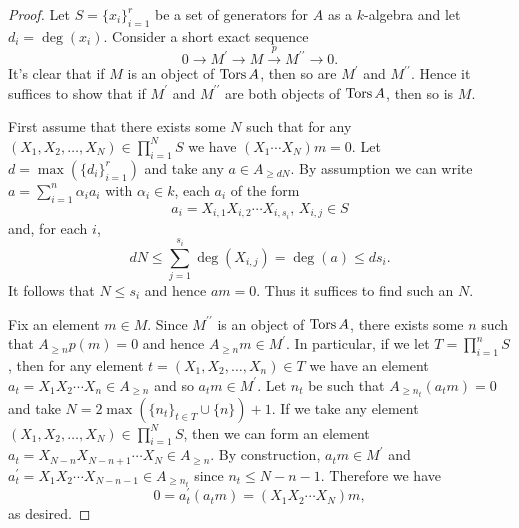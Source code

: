 \begin{proof}
  Let \(S = \{x_i\}_{i=1}^r\) be a set of generators for \(A\) as a \(k\)-algebra and let \(d_i = \deg(x_i)\).
  Consider a short exact sequence
  \[0 \to M^\prime \to M \overset{p}\to M^{\prime\prime} \to 0.\]
  It's clear that if \(M\) is an object of \(\operatorname{Tors}A\), then so are \(M^\prime\) and \(M^{\prime\prime}\).
  Hence it suffices to show that if \(M^\prime\) and \(M^{\prime\prime}\) are both objects of \(\operatorname{Tors}A\), then so is \(M\).
  
  First assume that there exists some \(N\) such that for any \((X_1, X_2, \ldots, X_N) \in \prod_{i = 1}^N S\) we have \((X_1 \cdots X_N)m = 0\).
  Let \(d = \max(\{d_i\}_{i = 1}^r)\) and take any \(a \in A_{\geq dN}\).
  By assumption we can write \(a = \sum_{i=1}^n \alpha_i a_i\) with \(\alpha_i \in k\), each \(a_i\) of the form
  \[a_i = X_{i,1} X_{i,2}\cdots X_{i, s_i},\, X_{i,j} \in S\]
  and, for each \(i\),
  \[dN \leq \sum_{j = 1}^{s_i} \deg(X_{i,j}) = \deg(a) \leq ds_i.\]
  It follows that \(N \leq s_i\) and hence \(am = 0\).
  Thus it suffices to find such an \(N\).

  Fix an element \(m \in M\).
  Since \(M^{\prime\prime}\) is an object of \(\operatorname{Tors}A\), there exists some \(n\) such that \(A_{\geq n} p(m) = 0\) and hence \(A_{\geq n}m \in M^\prime\).
  In particular, if we let \(T = \prod_{i = 1}^n S\), then for any element \(t = (X_1, X_2, \ldots, X_n) \in T\) we have an element \(a_t = X_1 X_2 \cdots X_n \in A_{\geq n}\) and so \(a_t m \in M^\prime\).
  Let \(n_t\) be such that \(A_{\geq n_t} (a_t m) = 0\) and take \(N = 2\max(\{n_t\}_{t \in T} \cup \{n\}) + 1\).
  If we take any element \((X_1, X_2, \ldots, X_N) \in \prod_{i = 1}^N S\), then we can form an element \(a_t = X_{N - n} X_{N - n + 1} \cdots X_N \in A_{\geq n}\).
  By construction, \(a_t m \in M^\prime\) and \(a_t^\prime = X_1 X_2 \cdots X_{N - n - 1} \in A_{\geq n_t}\) since \(n_t \leq N - n - 1\).
  Therefore we have
  \[0 = a_t^\prime (a_t m) = (X_1 X_2 \cdots X_N) m,\]
  as desired.
\end{proof}

